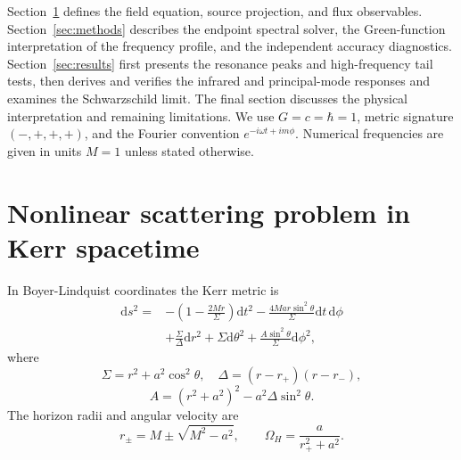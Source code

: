 \documentclass[aps,prd,twocolumn,10pt,nofootinbib,superscriptaddress,floatfix]{revtex4-2}
\newcommand{\dd}{\mathrm{d}}
\newcommand{\rp}{r_+}
\newcommand{\rmn}{r_-}
\newcommand{\DeltaK}{\Delta}
\begin{document}
Section~\ref{sec:problem} defines the field equation, source projection, and
flux observables.  Section~\ref{sec:methods} describes the endpoint spectral
solver, the Green-function interpretation of the frequency profile, and
the independent accuracy diagnostics.  Section~\ref{sec:results} first
presents the resonance peaks and high-frequency tail tests, then derives
and verifies the infrared and principal-mode responses and examines
the Schwarzschild limit.  The final
section discusses the physical interpretation and remaining limitations.
We use $G=c=\hbar=1$, metric signature $(-,+,+,+)$, and the Fourier convention
$e^{-i\omega t+im\phi}$.  Numerical frequencies are given in units $M=1$
unless stated otherwise.
\section{Nonlinear scattering problem in Kerr spacetime}
\label{sec:problem}

In Boyer-Lindquist coordinates the Kerr metric is
\begin{align}
\dd s^2={}&-\left(1-\frac{2Mr}{\Sigma}\right)\dd t^2
-\frac{4Mar\sin^2\theta}{\Sigma}\dd t\,\dd\phi
\nonumber\\
&+\frac{\Sigma}{\DeltaK}\dd r^2+\Sigma\dd\theta^2
+\frac{A\sin^2\theta}{\Sigma}\dd\phi^2 ,
\end{align}
where
\begin{equation}
\Sigma=r^2+a^2\cos^2\theta,\quad
\DeltaK=(r-\rp)(r-\rmn),
\end{equation}
\begin{equation}
A=(r^2+a^2)^2-a^2\DeltaK\sin^2\theta .
\end{equation}
The horizon radii and angular velocity are
\begin{equation}
r_\pm=M\pm\sqrt{M^2-a^2},\qquad
\Omega_H=\frac{a}{\rp^2+a^2}.
\end{equation}
\end{document}
